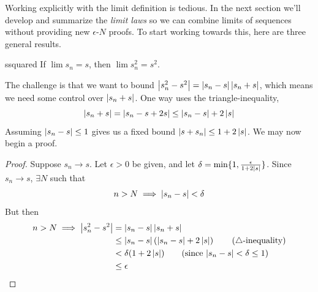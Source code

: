 
\vfil
\goodbreak



Working explicitly with the limit definition is tedious. In the next section we'll develop and summarize the \emph{limit laws} so we can combine limits of sequences without providing new $\epsilon$-$N$ proofs. To start working towards this, here are three general results.

\begin{lemm}{}{ssquared}
If $\lim s_n=s$, then  $\lim s_n^2=s^2$.
\end{lemm}

The challenge is that we want to bound $\left| s_n^2-s^2\right|=\left| s_n-s\right|\left| s_n+s\right|$, which means we need some control over $\left| s_n+s\right|$. One way uses the triangle-inequality,
\[\left| s_n+s\right|=\left| s_n-s+2s\right|\le\left| s_n-s\right|+2\left| s\right|\]
Assuming $\left| s_n-s\right|\le 1$ gives us a fixed bound $\left| s+s_n\right|\le 1+2\left| s\right|$. We may now begin a proof.

\begin{proof}
Suppose $s_n\to s$. Let $\epsilon>0$ be given, and let $\delta=\min\{1,\frac\epsilon{1+2\left| s\right|}\}$. Since $s_n\to s$, $\exists N$ such that
\[n>N\implies \left| s_n-s\right|<\delta\]
But then
\begin{align*}
n>N\implies \nm{s_n^2-s^2}&=\nm{s_n-s}\nm{s_n+s}\\
&\le\nm{s_n-s}\left(\nm{s_n-s}+2\nm s\right) \tag*{($\triangle$-inequality)}\\
&<\delta(1+2\nm s)\tag*{(since $\nm{s_n-s}<\delta\le 1$)}\\
&\le\epsilon\tag*{\qedhere}
\end{align*} 
\end{proof}



